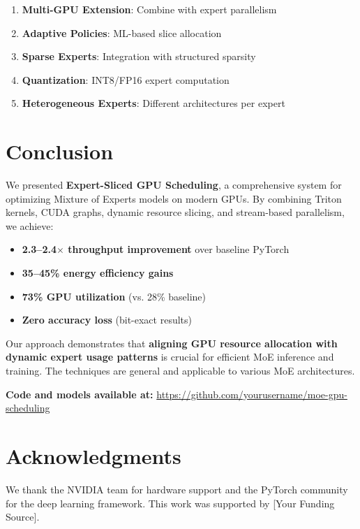 \documentclass{article}
\begin{document}
\begin{enumerate}
    \item \textbf{Multi-GPU Extension}: Combine with expert parallelism
    \item \textbf{Adaptive Policies}: ML-based slice allocation
    \item \textbf{Sparse Experts}: Integration with structured sparsity
    \item \textbf{Quantization}: INT8/FP16 expert computation
    \item \textbf{Heterogeneous Experts}: Different architectures per expert
\end{enumerate}

\section{Conclusion}

We presented \textbf{Expert-Sliced GPU Scheduling}, a comprehensive system for optimizing Mixture of Experts models on modern GPUs. By combining Triton kernels, CUDA graphs, dynamic resource slicing, and stream-based parallelism, we achieve:

\begin{itemize}
    \item \textbf{2.3--2.4$\times$ throughput improvement} over baseline PyTorch
    \item \textbf{35--45\% energy efficiency gains}
    \item \textbf{73\% GPU utilization} (vs. 28\% baseline)
    \item \textbf{Zero accuracy loss} (bit-exact results)
\end{itemize}

Our approach demonstrates that \textbf{aligning GPU resource allocation with dynamic expert usage patterns} is crucial for efficient MoE inference and training. The techniques are general and applicable to various MoE architectures.

\textbf{Code and models available at:} \url{https://github.com/yourusername/moe-gpu-scheduling}

\section*{Acknowledgments}

We thank the NVIDIA team for hardware support and the PyTorch community for the deep learning framework. This work was supported by [Your Funding Source].
\end{document}
